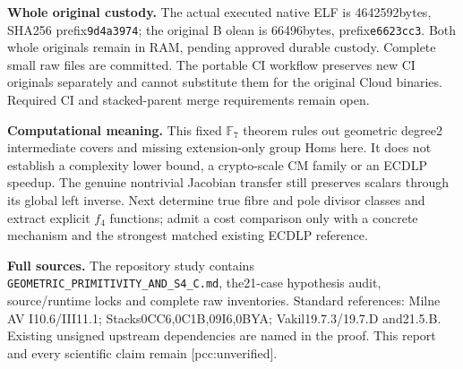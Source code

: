 \documentclass[10pt,a4paper]{article}
\begin{document}
\textbf{Whole original custody.} The actual executed native ELF is
4642592bytes, SHA256 prefix\texttt{9d4a3974}; the original B olean is
66496bytes, prefix\texttt{e6623cc3}. Both whole originals remain in RAM,
pending approved durable custody. Complete small raw files are committed.
The portable CI workflow preserves new CI originals separately and
cannot substitute them for the original Cloud binaries. Required CI and
stacked-parent merge requirements remain open.

\textbf{Computational meaning.} This fixed $\mathbb F_7$ theorem rules
out geometric degree2 intermediate covers and missing extension-only
group Homs here. It does not establish a complexity lower bound, a
crypto-scale CM family or an ECDLP speedup. The genuine nontrivial
Jacobian transfer still preserves scalars through its global left
inverse. Next determine true fibre and pole divisor classes and extract
explicit $f_4$ functions; admit a cost comparison only with a concrete
mechanism and the strongest matched existing ECDLP reference.

\textbf{Full sources.} The repository study contains
\texttt{GEOMETRIC\_PRIMITIVITY\_AND\_S4\_C.md}, the21-case hypothesis
audit, source/runtime locks and complete raw inventories. Standard
references: Milne AV I10.6/III11.1; Stacks0CC6,0C1B,09I6,0BYA;
Vakil19.7.3/19.7.D and21.5.B. Existing unsigned upstream dependencies
are named in the proof. This report and every scientific claim remain
[pcc:unverified].
\end{document}

